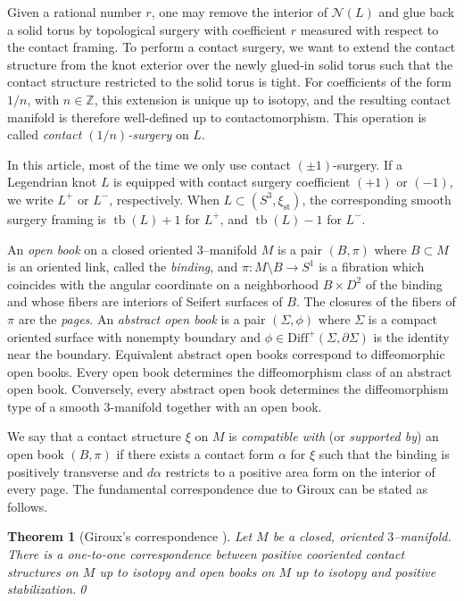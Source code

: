 \documentclass{amsart}
\numberwithin{equation}{section}
\numberwithin{figure}{section}
\newtheorem{theorem}{Theorem}[section]
\theoremstyle{definition}
\theoremstyle{remark}
\DeclareMathOperator{\tb}{tb}
\let\oldSigma\Sigma
\renewcommand{\Sigma}{\oldSigma}
\let\oldalpha\alpha %
\renewcommand{\alpha}{\oldalpha}
\let\olddxi\xi %
\renewcommand{\xi}{\olddxi}
\newcommand{\xist}{\olddxi_{\mathrm{st}}}
\begin{document}
Given a rational number \(r\), one may remove the interior of \(\mathcal N(L)\) and glue back a solid torus by topological surgery with coefficient \(r\) measured with respect to the contact framing. To perform a contact surgery, we want to extend the contact structure from the knot exterior over the newly glued-in solid torus such that the contact structure restricted to the solid torus is tight. For coefficients of the form \(1/n\), with \(n\in\mathbb Z\), this extension is unique up to isotopy, and the resulting contact manifold is therefore well-defined up to contactomorphism. This operation is called \emph{contact \((1/n)\)-surgery} on \(L\).

In this article, most of the time we only use contact \((\pm1)\)-surgery. If a Legendrian knot \(L\) is equipped with contact surgery coefficient \((+1)\) or \((-1)\), we write \(L^+\) or \(L^-\), respectively. When \(L\subset(S^3,\xist)\), the corresponding smooth surgery framing is \(\tb(L)+1\) for \(L^+\), and \(\tb(L)-1\) for \(L^-\).

An \emph{open book} on a closed oriented $3$--manifold $M$ is a pair $(B,\pi)$ where $B\subset M$ is an oriented link, called the \emph{binding}, and $\pi\colon M\setminus B\to S^1$ is a fibration which coincides with the angular coordinate on a neighborhood $B\times D^2$ of the binding and whose fibers are interiors of Seifert surfaces of $B$. The closures of the fibers of $\pi$ are the \emph{pages}. An \emph{abstract open book} is a pair $(\Sigma,\phi)$ where $\Sigma$ is a compact oriented surface with nonempty boundary and $\phi\in\mathrm{Diff}^+(\Sigma,\partial\Sigma)$ is the identity near the boundary. Equivalent abstract open books correspond to diffeomorphic open books. Every open book determines the diffeomorphism class of an abstract open book. Conversely, every abstract open book determines the diffeomorphism type of a smooth $3$-manifold together with an open book.

We say that a contact structure $\xi$ on $M$ is \emph{compatible with} (or \emph{supported by}) an open book $(B,\pi)$ if there exists a contact form $\alpha$ for $\xi$ such that the binding is positively transverse and $d\alpha$ restricts to a positive area form on the interior of every page. The fundamental correspondence due to Giroux can be stated as follows.

\begin{theorem}[Giroux's correspondence \cite{Giroux02,BHH24,LicVer1_24,LicVer2_24}]\label{thm:Giroux_correspondence}
Let $M$ be a closed, oriented $3$--manifold. There is a one-to-one correspondence between positive cooriented contact structures on $M$ up to isotopy and open books on $M$ up to isotopy and positive stabilization.\qed
\end{theorem}
\end{document}
